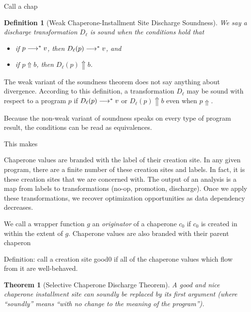 \documentclass{sigplanconf}
\newtheorem{definition}{Definition}
\newtheorem{theorem}{Theorem}
\begin{document}
Call a chap



\begin{definition}[Weak Chaperone-Installment Site Discharge Soundness]
We say a discharge transformation $D_\ell$ is sound when the conditions hold that
\begin{itemize}
\item if $p\longrightarrow^{*} v$, then $D_\ell(p)\longrightarrow^{*} v$, and
\item if $p\Uparrow b$, then $D_\ell(p)\Uparrow b$.
\end{itemize}
\end{definition}

The weak variant of the soundness theorem does not say anything about divergence. According to this definition, a transformation $D_\ell$ may be sound with respect to a program $p$ if $D_\ell(p)\longrightarrow^{*} v$ or $D_\ell(p)\Uparrow b$ even when $p\Uparrow$.

Because the non-weak variant of soundness speaks on every type of program result, the conditions can be read as equivalences.

This makes 

Chaperone values are branded with the label of their creation site. In any given program, there are a finite number of these creation sites and labels. In fact, it is these creation sites that we are concerned with. The output of an analysis is a map from labels to transformations (no-op, promotion, discharge). Once we apply these transformations, we recover optimization opportunities as data dependency decreases.

We call a wrapper function $g$ an \emph{originator} of a chaperone $c_0$ if $c_0$ is created in within the extent of $g$. Chaperone values are also branded with their parent chaperon

Definition: call a creation site good0 if all of the chaperone values which flow from it are well-behaved.


\begin{theorem}[Selective Chaperone Discharge Theorem]
A good and nice chaperone installment site can soundly be replaced by its first argument (where ``soundly'' means ``with no change to the meaning of the program'').
\end{theorem}
\end{document}
